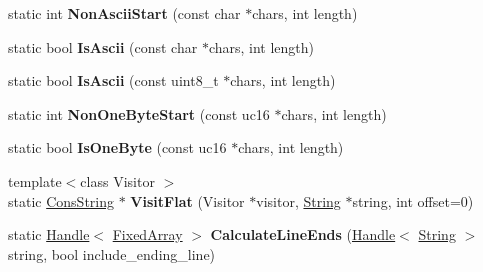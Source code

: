 \begin{DoxyCompactItemize}
\item 
static int {\bfseries Non\+Ascii\+Start} (const char $\ast$chars, int length)\hypertarget{classv8_1_1internal_1_1_string_a1d5c14238cade24eaa92c57856deb69f}{}\label{classv8_1_1internal_1_1_string_a1d5c14238cade24eaa92c57856deb69f}

\item 
static bool {\bfseries Is\+Ascii} (const char $\ast$chars, int length)\hypertarget{classv8_1_1internal_1_1_string_af725d9dc277683fa4486a928348ba75a}{}\label{classv8_1_1internal_1_1_string_af725d9dc277683fa4486a928348ba75a}

\item 
static bool {\bfseries Is\+Ascii} (const uint8\+\_\+t $\ast$chars, int length)\hypertarget{classv8_1_1internal_1_1_string_a4960adf7c08c3c7f4ff6cb3091341288}{}\label{classv8_1_1internal_1_1_string_a4960adf7c08c3c7f4ff6cb3091341288}

\item 
static int {\bfseries Non\+One\+Byte\+Start} (const uc16 $\ast$chars, int length)\hypertarget{classv8_1_1internal_1_1_string_a803ee7a24653b9b58b659b346e063b52}{}\label{classv8_1_1internal_1_1_string_a803ee7a24653b9b58b659b346e063b52}

\item 
static bool {\bfseries Is\+One\+Byte} (const uc16 $\ast$chars, int length)\hypertarget{classv8_1_1internal_1_1_string_ac6716eabda6922785064cd84ce169f0d}{}\label{classv8_1_1internal_1_1_string_ac6716eabda6922785064cd84ce169f0d}

\item 
{\footnotesize template$<$class Visitor $>$ }\\static \hyperlink{classv8_1_1internal_1_1_cons_string}{Cons\+String} $\ast$ {\bfseries Visit\+Flat} (Visitor $\ast$visitor, \hyperlink{classv8_1_1internal_1_1_string}{String} $\ast$string, int offset=0)\hypertarget{classv8_1_1internal_1_1_string_a9b944f06fee81942a8030aa635ed1cd4}{}\label{classv8_1_1internal_1_1_string_a9b944f06fee81942a8030aa635ed1cd4}

\item 
static \hyperlink{classv8_1_1internal_1_1_handle}{Handle}$<$ \hyperlink{classv8_1_1internal_1_1_fixed_array}{Fixed\+Array} $>$ {\bfseries Calculate\+Line\+Ends} (\hyperlink{classv8_1_1internal_1_1_handle}{Handle}$<$ \hyperlink{classv8_1_1internal_1_1_string}{String} $>$ string, bool include\+\_\+ending\+\_\+line)\hypertarget{classv8_1_1internal_1_1_string_ac2486293ec2b4544ed1d30dfefbc3956}{}\label{classv8_1_1internal_1_1_string_ac2486293ec2b4544ed1d30dfefbc3956}

\end{DoxyCompactItemize}
